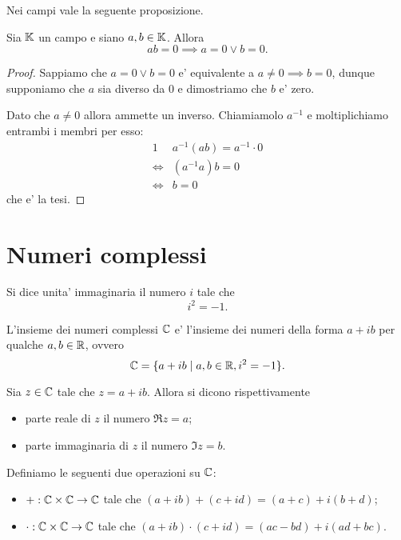 Nei campi vale la seguente proposizione.
\begin{proposition}
     \label{annullamento_prodotto}
    Sia $\mathbb{K}$ un campo e siano $a, b \in \mathbb{K}$. Allora \[
        ab = 0 \implies a = 0 \lor b = 0.    
    \]
\end{proposition}
\begin{proof}
    Sappiamo che $a = 0 \lor b = 0$ e' equivalente a $a \neq 0 \implies b = 0$, dunque supponiamo che $a$ sia diverso da $0$ e dimostriamo che $b$ e' zero.

    Dato che $a \neq 0$ allora ammette un inverso. Chiamiamolo $a^{-1}$ e moltiplichiamo entrambi i membri per esso:
    \begin{alignat*}
        {1}
        &a^{-1}(ab) = a^{-1} \cdot 0\\
        \iff &(a^{-1}a)b = 0 \\
        \iff &b = 0
    \end{alignat*}
    che e' la tesi.
\end{proof}

\section{Numeri complessi}

\begin{definition}
    Si dice unita' immaginaria il numero $i$ tale che \[
        i^2 = -1.    
    \]
\end{definition}

\begin{definition}
    L'insieme dei numeri complessi $\mathbb{C}$ e' l'insieme dei numeri della forma $a+ib$ per qualche $a, b \in \mathbb{R}$, ovvero \[
        \mathbb{C} = \{ a + ib \mid a, b \in \mathbb{R}, i^2 = -1\}.  
    \]
\end{definition}

\begin{definition}
    Sia $z \in \mathbb{C}$ tale che $z = a + ib$. Allora si dicono rispettivamente \begin{itemize}
        \item parte reale di $z$ il numero $\Re z = a$;
        \item parte immaginaria di $z$ il numero $\Im z = b$.
    \end{itemize}
\end{definition}

\begin{definition}
    Definiamo le seguenti due operazioni su $\mathbb{C}$:
    \begin{itemize}
        \item $+ : \mathbb{C} \times \mathbb{C} \to \mathbb{C}$ tale che $(a + ib) + (c + id) = (a + c) + i(b + d)$;
        \item $\cdot : \mathbb{C} \times \mathbb{C} \to \mathbb{C}$ tale che $(a + ib) \cdot (c + id) = (ac - bd) + i(ad + bc)$.
    \end{itemize}
\end{definition}

